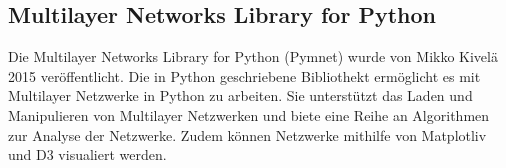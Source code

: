 \subsection{Multilayer Networks Library for Python}

Die Multilayer Networks Library for Python (Pymnet) wurde von Mikko Kivelä 2015 veröffentlicht. 
Die in Python geschriebene Bibliothekt ermöglicht es mit Multilayer Netzwerke in Python zu arbeiten. Sie unterstützt das Laden und Manipulieren von Multilayer Netzwerken und biete eine Reihe an Algorithmen zur Analyse der Netzwerke.
Zudem können Netzwerke mithilfe von Matplotliv und D3 visualiert werden.
